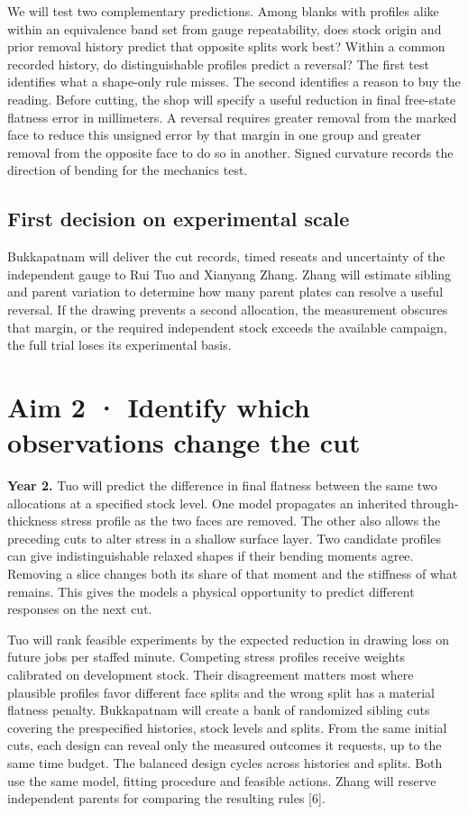 \documentclass[11pt,letterpaper]{article}
\begin{document}
We will test two complementary predictions. Among blanks with profiles alike within an equivalence band set from gauge repeatability, does stock origin and prior removal history predict that opposite splits work best? Within a common recorded history, do distinguishable profiles predict a reversal? The first test identifies what a shape-only rule misses. The second identifies a reason to buy the reading. Before cutting, the shop will specify a useful reduction in final free-state flatness error in millimeters. A reversal requires greater removal from the marked face to reduce this unsigned error by that margin in one group and greater removal from the opposite face to do so in another. Signed curvature records the direction of bending for the mechanics test.

\subsection*{First decision on experimental scale}

Bukkapatnam will deliver the cut records, timed reseats and uncertainty of the independent gauge to Rui Tuo and Xianyang Zhang. Zhang will estimate sibling and parent variation to determine how many parent plates can resolve a useful reversal. If the drawing prevents a second allocation, the measurement obscures that margin, or the required independent stock exceeds the available campaign, the full trial loses its experimental basis.

\newpage

\section*{Aim 2 · Identify which observations change the cut}

\textbf{Year 2.} Tuo will predict the difference in final flatness between the same two allocations at a specified stock level. One model propagates an inherited through-thickness stress profile as the two faces are removed. The other also allows the preceding cuts to alter stress in a shallow surface layer. Two candidate profiles can give indistinguishable relaxed shapes if their bending moments agree. Removing a slice changes both its share of that moment and the stiffness of what remains. This gives the models a physical opportunity to predict different responses on the next cut.

Tuo will rank feasible experiments by the expected reduction in drawing loss on future jobs per staffed minute. Competing stress profiles receive weights calibrated on development stock. Their disagreement matters most where plausible profiles favor different face splits and the wrong split has a material flatness penalty. Bukkapatnam will create a bank of randomized sibling cuts covering the prespecified histories, stock levels and splits. From the same initial cuts, each design can reveal only the measured outcomes it requests, up to the same time budget. The balanced design cycles across histories and splits. Both use the same model, fitting procedure and feasible actions. Zhang will reserve independent parents for comparing the resulting rules [6].
\end{document}
